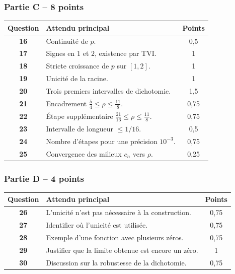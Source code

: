 \documentclass[11pt,a4paper]{article}
\begin{document}
\subsubsection*{Partie C -- 8 points}

\begin{tabularx}{\linewidth}{>{\bfseries}c X c}
\toprule
Question & Attendu principal & Points \\
\midrule
16 & Continuité de \(p\). & 0,5 \\
17 & Signes en \(1\) et \(2\), existence par TVI. & 1 \\
18 & Stricte croissance de \(p\) sur \([1,2]\). & 1 \\
19 & Unicité de la racine. & 1 \\
20 & Trois premiers intervalles de dichotomie. & 1,5 \\
21 & Encadrement \(\frac54\leq\rho\leq\frac{11}{8}\). & 0,75 \\
22 & Étape supplémentaire \(\frac{21}{16}\leq\rho\leq\frac{11}{8}\). & 0,75 \\
23 & Intervalle de longueur \(\leq 1/16\). & 0,5 \\
24 & Nombre d'étapes pour une précision \(10^{-3}\). & 0,75 \\
25 & Convergence des milieux \(c_n\) vers \(\rho\). & 0,25 \\
\bottomrule
\end{tabularx}

\subsubsection*{Partie D -- 4 points}

\begin{tabularx}{\linewidth}{>{\bfseries}c X c}
\toprule
Question & Attendu principal & Points \\
\midrule
26 & L'unicité n'est pas nécessaire à la construction. & 0,75 \\
27 & Identifier où l'unicité est utilisée. & 0,75 \\
28 & Exemple d'une fonction avec plusieurs zéros. & 0,75 \\
29 & Justifier que la limite obtenue est encore un zéro. & 1 \\
30 & Discussion sur la robustesse de la dichotomie. & 0,75 \\
\bottomrule
\end{tabularx}

\newpage
\end{document}
